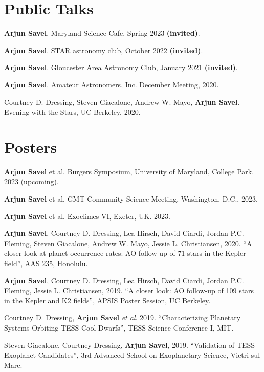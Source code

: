 \documentclass[letterpaper,10.5pt]{article}
\newcommand{\resumeSubHeadingListStart}{\begin{itemize}[leftmargin=*]}
\newcommand{\shorterSection}[1]{\vspace{-10pt}\section{#1}}
\begin{document}
\shorterSection{Public Talks}
\begin{list}{}{\cvlist}
\item[{\color{numcolor}\scriptsize5}] \textbf{Arjun Savel}. Maryland Science Cafe, Spring 2023 \textbf{(invited)}.
\item[{\color{numcolor}\scriptsize4}] \textbf{Arjun Savel}. STAR astronomy club, October 2022 \textbf{(invited)}.
\item[{\color{numcolor}\scriptsize3}] \textbf{Arjun Savel}. Gloucester Area Astronomy Club, January 2021 \textbf{(invited)}.
\item[{\color{numcolor}\scriptsize2}] \textbf{Arjun Savel}. Amateur Astronomers, Inc. December Meeting, 2020.
\item[{\color{numcolor}\scriptsize1}] Courtney D. Dressing, Steven Giacalone, Andrew W. Mayo, \textbf{Arjun Savel}. Evening with the Stars, UC Berkeley, 2020.
\end{list}


\shorterSection{Posters}
\small
  \begin{list}{}{\cvlist}
  \item[{\color{numcolor}\scriptsize7}]\textbf{Arjun Savel} et al. Burgers Symposium, University of Maryland, College Park. 2023 (upcoming).
  
  \item[{\color{numcolor}\scriptsize6}]\textbf{Arjun Savel} et al. GMT Community Science Meeting, Washington, D.C., 2023.
  
  \item[{\color{numcolor}\scriptsize5}]\textbf{Arjun Savel} et al. Exoclimes VI, Exeter, UK. 2023.
  
  \item[{\color{numcolor}\scriptsize4}]\textbf{Arjun Savel}, Courtney D. Dressing, Lea Hirsch, David Ciardi, Jordan P.C. Fleming, Steven Giacalone, Andrew W. Mayo, Jessie L. Christiansen, 2020. “A closer look at planet occurrence rates: AO follow-up of 71 stars in the Kepler field”, AAS 235, Honolulu.

  \item[{\color{numcolor}\scriptsize3}] \textbf{Arjun Savel}, Courtney D. Dressing, Lea Hirsch, David Ciardi, Jordan P.C. Fleming, Jessie L. Christiansen, 2019. “A closer look: AO follow-up of 109 stars in the Kepler and K2 fields”, APSIS Poster Session, UC Berkeley.

\item[{\color{numcolor}\scriptsize2}] Courtney D. Dressing, \textbf{Arjun Savel} \textit{et al}. 2019. “Characterizing Planetary Systems Orbiting TESS Cool Dwarfs”, TESS Science Conference I, MIT.

\item[{\color{numcolor}\scriptsize1}] Steven Giacalone, Courtney Dressing, \textbf{Arjun Savel}, 2019. “Validation of TESS Exoplanet Candidates”, 3rd Advanced School on Exoplanetary Science, Vietri sul Mare.

  \end{list}
\end{document}
